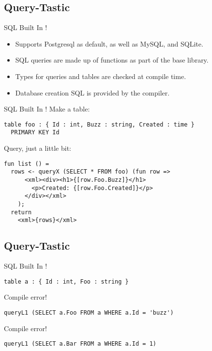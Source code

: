 \documentclass[aspectratio=169]{beamer}
\begin{document}
\subsection{Query-Tastic}
\begin{frame}{SQL Built In !}

\begin{itemize}
\item Supports Postgresql as default, as well as MySQL, and SQLite.
\item SQL queries are made up of functions as part of the base library.
\item Types for queries and tables are checked at compile time.
\item Database creation SQL is provided by the compiler.
\end{itemize}
\end{frame}
\begin{frame}[fragile]{SQL Built In !}
Make a table:
\begin{verbatim}
table foo : { Id : int, Buzz : string, Created : time }
  PRIMARY KEY Id
\end{verbatim}
Query, just a little bit:
\begin{verbatim}
fun list () =
  rows <- queryX (SELECT * FROM foo) (fun row => 
      <xml><div><h1>{[row.Foo.Buzz]}</h1>
        <p>Created: {[row.Foo.Created]}</p>
      </div></xml>
    );
  return
    <xml>{rows}</xml>
\end{verbatim}
\end{frame}

\subsection{Query-Tastic}
\begin{frame}[fragile]{SQL Built In !}
\begin{verbatim}
table a : { Id : int, Foo : string }
\end{verbatim}
Compile error!
\begin{verbatim}
queryL1 (SELECT a.Foo FROM a WHERE a.Id = 'buzz')
\end{verbatim}
Compile error!
\begin{verbatim}
queryL1 (SELECT a.Bar FROM a WHERE a.Id = 1)
\end{verbatim}
\end{frame}
\end{document}
